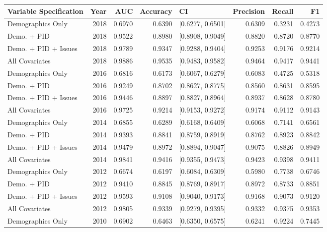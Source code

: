 \begin{table}[H]
\centering
\begin{tabular}{lrrrlrrr}
  \toprule
Variable Specification & Year & AUC & Accuracy & CI & Precision & Recall & F1 \\ 
  \midrule
Demographics Only & 2018 & 0.6970 & 0.6390 & [0.6277, 0.6501] & 0.6309 & 0.3231 & 0.4273 \\ 
  Demo. + PID & 2018 & 0.9522 & 0.8980 & [0.8908, 0.9049] & 0.8820 & 0.8720 & 0.8770 \\ 
  Demo. + PID + Issues & 2018 & 0.9789 & 0.9347 & [0.9288, 0.9404] & 0.9253 & 0.9176 & 0.9214 \\ 
  All Covariates & 2018 & 0.9886 & 0.9535 & [0.9483, 0.9582] & 0.9464 & 0.9417 & 0.9441 \\ 
  Demographics Only & 2016 & 0.6816 & 0.6173 & [0.6067, 0.6279] & 0.6083 & 0.4725 & 0.5318 \\ 
  Demo. + PID & 2016 & 0.9249 & 0.8702 & [0.8627, 0.8775] & 0.8560 & 0.8631 & 0.8595 \\ 
  Demo. + PID + Issues & 2016 & 0.9446 & 0.8897 & [0.8827, 0.8964] & 0.8937 & 0.8628 & 0.8780 \\ 
  All Covariates & 2016 & 0.9725 & 0.9214 & [0.9153, 0.9272] & 0.9174 & 0.9112 & 0.9143 \\ 
  Demographics Only & 2014 & 0.6855 & 0.6289 & [0.6168, 0.6409] & 0.6068 & 0.7141 & 0.6561 \\ 
  Demo. + PID & 2014 & 0.9393 & 0.8841 & [0.8759, 0.8919] & 0.8762 & 0.8923 & 0.8842 \\ 
  Demo. + PID + Issues & 2014 & 0.9479 & 0.8972 & [0.8894, 0.9047] & 0.9075 & 0.8826 & 0.8949 \\ 
  All Covariates & 2014 & 0.9841 & 0.9416 & [0.9355, 0.9473] & 0.9423 & 0.9398 & 0.9411 \\ 
  Demographics Only & 2012 & 0.6674 & 0.6197 & [0.6084, 0.6309] & 0.5980 & 0.7738 & 0.6746 \\ 
  Demo. + PID & 2012 & 0.9410 & 0.8845 & [0.8769, 0.8917] & 0.8972 & 0.8733 & 0.8851 \\ 
  Demo. + PID + Issues & 2012 & 0.9593 & 0.9108 & [0.9040, 0.9173] & 0.9168 & 0.9073 & 0.9120 \\ 
  All Covariates & 2012 & 0.9805 & 0.9339 & [0.9279, 0.9395] & 0.9332 & 0.9375 & 0.9353 \\ 
  Demographics Only & 2010 & 0.6902 & 0.6463 & [0.6350, 0.6575] & 0.6241 & 0.9224 & 0.7445 \\ 

\end{tabular}
\end{table}
